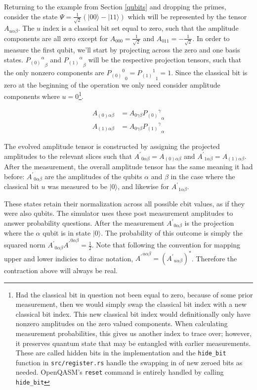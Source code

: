 \documentclass[%
 reprint,
 amsmath,amssymb,
 aps,
]{revtex4-2}
\begin{document}
Returning to the example from Section \ref{qubits} and dropping the primes, consider the state $\Psi = \frac{1}{\sqrt{2}} (|00\rangle - |11\rangle)$ which will be represented by the tensor $A_{u \alpha\beta }$. The $u$ index is a classical bit set equal to zero, such that the amplitude components are all zero except for $A_{000} = \frac{1}{\sqrt{2}}$ and $A_{011} = -\frac{1}{\sqrt{2}}$. In order to measure the first qubit, we'll start by projecting across the zero and one basis states. ${{P_{(0)}}^{\alpha}}_{\beta}$ and ${{P_{(1)}}^{\alpha}}_{\beta}$ will be the respective projection tensors, such that the only nonzero components are ${{P_{(0)}}^{0}}_0 = {{P_{(1)}}^{1}}_1 = 1$. Since the classical bit is zero at the beginning of the operation we only need consider amplitude components where $u=0$\footnote{Had the classical bit in question not been equal to zero, because of some prior measurement, then we would simply swap the classical bit index with a new classical bit index. This new classical bit index would definitionally only have nonzero amplitudes on the zero valued components. When calculating measurement probabilities, this gives us another index to trace over; however, it preserves quantum state that may be entangled with earlier measurements. These are called hidden bits in the implementation and the \texttt{hide\_bit} function in \texttt{src/register.rs} handle the swapping in of new zeroed bits as needed. OpenQASM's \texttt{reset} command is entirely handled by calling \texttt{hide\_bit}}.

\begin{align*} 
A_{(0)\alpha\beta}  &= A_{0 \gamma\beta}  {{P_{(0)}}^{\gamma}}_{\alpha} \\
A_{(1)\alpha\beta}  &= A_{0 \gamma\beta}  {{P_{(1)}}^{\gamma}}_{\alpha}
\end{align*}

The evolved amplitude tensor is constructed by assigning the projected amplitudes to the relevant slices such that ${A^\prime}_{0\alpha\beta} = A_{(0)\alpha\beta}$ and ${A^\prime}_{1\alpha\beta} = A_{(1)\alpha\beta}$. After the measurement, the overall amplitude tensor has the same meaning it had before: ${A^\prime}_{0 \alpha\beta}$ are the amplitudes of the qubits $\alpha$ and $\beta$ in the case where the classical bit $u$ was measured to be $|0\rangle$, and likewise for ${A^\prime}_{1 \alpha\beta}$.

These states retain their normalization across all possible cbit values, as if they were also qubits. The simulator uses these post measurement amplitudes to answer probability questions. After the measurement ${A^\prime}_{0 \alpha\beta}$ is the projection where the $\alpha$ qubit is in state $|0\rangle$. The probability of this outcome is simply the squared norm ${A^\prime}_{0 \alpha\beta}{A^\prime}^{0 \alpha\beta} = \frac{1}{2}$. Note that following the convention for mapping upper and lower indicies to dirac notation, ${A^\prime}^{u \alpha\beta}  = ({A^\prime}_{u \alpha\beta})^{\ast}$. Therefore the contraction above will always be real. 
\end{document}
